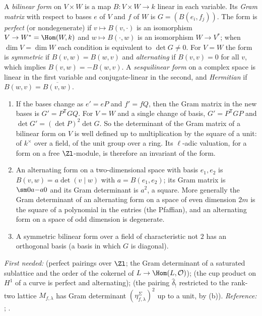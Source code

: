 \begin{definition}\label{def:prereq:bilinear}
A \emph{bilinear form} on $V\times W$ is a map $B\colon V\times W\to k$ linear in each variable.
Its \emph{Gram matrix} with respect to bases $e$ of $V$ and $f$ of $W$ is $G=(B(e_i,f_j))$. The form
is \emph{perfect} (or nondegenerate) if $v\mapsto B(v,\cdot)$ is an isomorphism $V\to W^*=\Hom(W,k)$
and $w\mapsto B(\cdot,w)$ is an isomorphism $W\to V^*$; when $\dim V=\dim W$ each condition is
equivalent to $\det G\ne0$. For $V=W$ the form is \emph{symmetric} if $B(v,w)=B(w,v)$ and
\emph{alternating} if $B(v,v)=0$ for all $v$, which implies $B(v,w)=-B(w,v)$. A \emph{sesquilinear
form} on a complex space is linear in the first variable and conjugate-linear in the second, and
\emph{Hermitian} if $B(w,v)=\overline{B(v,w)}$.
\end{definition}

\begin{theorem}\label{thm:prereq:gram}
\leavevmode
\begin{enumerate}[label=(\alph*)]
\item If the bases change as $e'=eP$ and $f'=fQ$, then the Gram matrix in the new bases is $G'=P^{\mathsf T}GQ$. For $V=W$
and a single change of basis, $G'=P^{\mathsf T}GP$ and $\det G'=(\det P)^2\det G$. So the
determinant of the Gram matrix of a bilinear form on $V$ is well defined up to multiplication by
the square of a unit: of $k^\times$ over a field, of the unit group over a ring. Its $\ell$-adic
valuation, for a form on a free $\Zl$-module, is therefore an invariant of the form.
\item An alternating form on a two-dimensional space with basis $e_1,e_2$ is
$B(v,w)=a\det(v\mid w)$ with $a=B(e_1,e_2)$; its Gram matrix is $\sm0a{-a}0$ and its Gram
determinant is $a^2$, a square. More generally the Gram determinant of an alternating form on a
space of even dimension $2m$ is the square of a polynomial in the entries (the Pfaffian), and an
alternating form on a space of odd dimension is degenerate.
\item A symmetric bilinear form over a field of characteristic not $2$ has an orthogonal basis
(a basis in which $G$ is diagonal).
\end{enumerate}
\end{theorem}
\noindent\emph{First needed:}  (perfect pairings over $\Zl$; the Gram determinant
of a saturated sublattice and the order of the cokernel of $L\to\Hom(L,\mathcal O)$);
 (the cup product on $H^1$ of a curve is perfect and alternating);
 (the pairing $\hat\delta_!$ restricted to the rank-two lattice $M_{f,\lambda}$
has Gram determinant $(\eta^\Sigma_{f,\lambda})^2$ up to a unit, by (b)). \emph{Reference:}
\cite[Chapter XV]{Lang}; \cite{Halmos74}.

